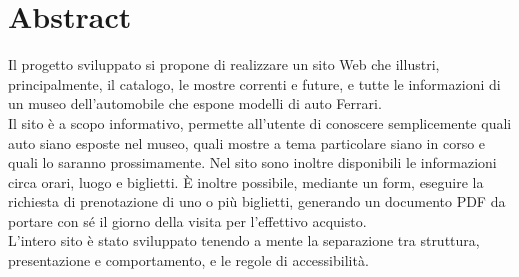 \section{Abstract}
Il progetto sviluppato si propone di realizzare un sito Web che illustri, principalmente, il catalogo, le mostre correnti e future, e tutte le informazioni di un museo dell'automobile che espone modelli di auto Ferrari.\\
Il sito è a scopo informativo, permette all'utente di conoscere semplicemente quali auto siano esposte nel museo, quali mostre a tema particolare siano in corso e quali lo saranno prossimamente. Nel sito sono inoltre disponibili le informazioni circa orari, luogo e biglietti. È inoltre possibile, mediante un form, eseguire la richiesta di prenotazione di uno o più biglietti, generando un documento PDF da portare con sé il giorno della visita per l'effettivo acquisto.\\
L'intero sito è stato sviluppato tenendo a mente la separazione tra struttura, presentazione e comportamento, e le regole di accessibilità.
